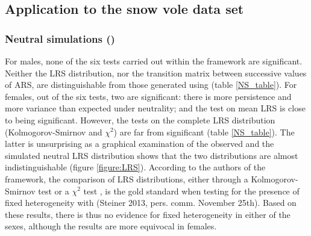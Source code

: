 \subsection{Application to the snow vole data set}
\subsubsection{Neutral simulations (\NSM)}
For males, none of the six tests carried out within the \NSM framework are significant. Neither the LRS distribution, nor the transition matrix between successive values of ARS, are distinguishable from those generated using \NSM (table \ref{NS_table}).
For females, out of the six tests, two are significant: there is more persistence and more variance than expected under neutrality; and the test on mean LRS is close to being significant. However, the tests on the complete LRS distribution (Kolmogorov-Smirnov and $\chi^2$) are far from significant (table \ref{NS_table}). The latter is unsurprising as a graphical examination of the observed and the simulated neutral LRS distribution shows that the two distributions are almost indistinguishable (figure \ref{figure:LRS}).
According to the authors of the \NSM framework, the comparison of LRS distributions, either through a Kolmogorov-Smirnov test \parencite[in][]{Steiner2012} or a $\chi^2$ test \parencite[in][]{Plard2012}, is the gold standard when testing for the presence of fixed heterogeneity with \NSM (Steiner 2013, pers. comm. November 25th). Based on these \NSM results, there is thus no evidence for fixed heterogeneity in either of the sexes, although the results are more equivocal in females.

